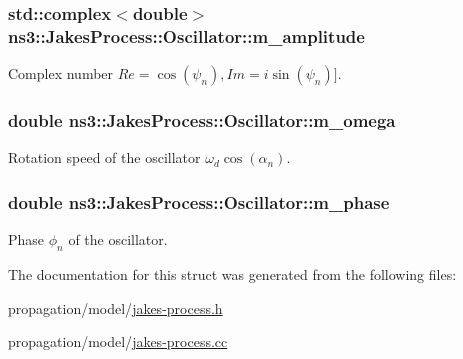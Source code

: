 \subsubsection[{\texorpdfstring{m\+\_\+amplitude}{m_amplitude}}]{\setlength{\rightskip}{0pt plus 5cm}std\+::complex$<$double$>$ ns3\+::\+Jakes\+Process\+::\+Oscillator\+::m\+\_\+amplitude}\hypertarget{structns3_1_1JakesProcess_1_1Oscillator_ab69b71d8d1cfa433ffaaeb40472ce7ff}{}\label{structns3_1_1JakesProcess_1_1Oscillator_ab69b71d8d1cfa433ffaaeb40472ce7ff}


Complex number $Re=\cos(\psi_n), Im = i\sin(\psi_n)]$. 

\subsubsection[{\texorpdfstring{m\+\_\+omega}{m_omega}}]{\setlength{\rightskip}{0pt plus 5cm}double ns3\+::\+Jakes\+Process\+::\+Oscillator\+::m\+\_\+omega}\hypertarget{structns3_1_1JakesProcess_1_1Oscillator_aa415d476ec92702bcf026edb708e267d}{}\label{structns3_1_1JakesProcess_1_1Oscillator_aa415d476ec92702bcf026edb708e267d}


Rotation speed of the oscillator $\omega_d \cos(\alpha_n)$. 

\subsubsection[{\texorpdfstring{m\+\_\+phase}{m_phase}}]{\setlength{\rightskip}{0pt plus 5cm}double ns3\+::\+Jakes\+Process\+::\+Oscillator\+::m\+\_\+phase}\hypertarget{structns3_1_1JakesProcess_1_1Oscillator_a14994e4e5a14734bac9b6cd6d8cd9a04}{}\label{structns3_1_1JakesProcess_1_1Oscillator_a14994e4e5a14734bac9b6cd6d8cd9a04}


Phase $\phi_n$ of the oscillator. 



The documentation for this struct was generated from the following files\+:\begin{DoxyCompactItemize}
\item 
propagation/model/\hyperlink{jakes-process_8h}{jakes-\/process.\+h}\item 
propagation/model/\hyperlink{jakes-process_8cc}{jakes-\/process.\+cc}\end{DoxyCompactItemize}
